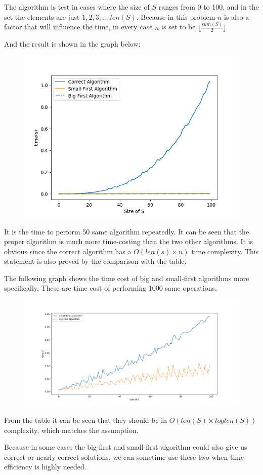 \documentclass{article}
\begin{document}
The algorithm is test in cases where the size of $S$ ranges from 0 to 100, and in the set the elements are just $1,2,3,....len(S)$. Because in this problem $n$ is also a factor that will influence the time, in every case $n$ is set to be $\lfloor \frac{sum(S)}{2} \rfloor$

And the result is shown in the graph below:

\begin{figure}[h]
    \centering
    \includegraphics[scale=0.5]{1.png}
\end{figure}

It is the time to perform 50 same algorithm repeatedly. It can be seen that the proper algorithm is much more time-costing than the two other algorithms. It is obvious since the correct algorithm has a $O(len(s)\times n)$ time complexity. This statement is also proved by the comparison with the table.

The following graph shows the time cost of big and small-first algorithms more specifically. These are time cost of performing 1000 same operations.

\begin{figure}[h]
  \centering
  \includegraphics[scale=0.3]{2.png}
\end{figure}

From the table it can be seen that they should be in $O(len(S)\times loglen(S))$ complexity, which matches the assumption.

Because in some cases the big-first and small-first algorithm could also give us correct or nearly correct solutions, we can sometime use these two when time efficiency is highly needed.
\end{document}
